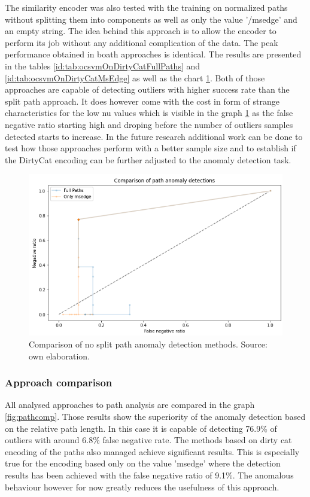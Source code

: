\documentclass[a4paper,twoside,12pt]{book}
\begin{document}
The similarity encoder was also tested with the training on normalized paths without splitting 
them into components as well as only the value '/msedge' and an empty string. The idea behind this approach
is to allow the encoder to perform its job without any additional complication of the data. The peak performance obtained in
boath approaches is identical. The results are presented in the tables \ref{id:tab:ocsvmOnDirtyCatFullPaths} 
and \ref{id:tab:ocsvmOnDirtyCatMsEdge} as well as the chart \ref{fig:ocsvmNoSplitComp}. Both of those approaches
are capable of detecting outliers with higher success rate than the split path approach. It does
however come with the cost in form of strange characteristics for the low nu values which is visible in the graph \ref{fig:ocsvmNoSplitComp}
as the false negative ratio starting high and droping before the number of outliers samples detected starts to increase.
In the future research additional work can be done to test how those approaches perform with a better sample size and to
establish if the DirtyCat encoding can be further adjusted to the anomaly detection task.

\begin{figure}
	\centering
	\includegraphics[scale=0.9]{images/OcsvmNoSplitComp}
	\caption{Comparison of no split path anomaly detection methods. Source: own elaboration.}
	\label{fig:ocsvmNoSplitComp}
 \end{figure}
 
\subsubsection{Approach comparison}

All analysed approaches to path analysis are compared in the graph \ref{fig:pathcomp}. Those results show the
superiority of the anomaly detection based on the relative path length. In this case it is capable of detecting 
76.9\% of outliers with around 6.8\% false negative rate. The methods based on dirty cat encoding of the paths also managed 
achieve significant results. This is especially true for the encoding based only on the value 'msedge' where 
the detection results has been achieved with the false negative ratio of 9.1\%. The anomalous behaviour however for now
greatly reduces the usefulness of this approach.
\end{document}
